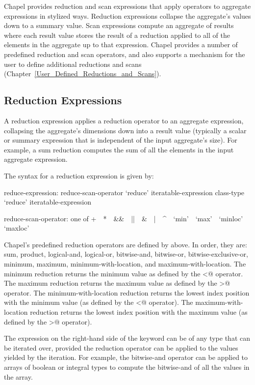 Chapel provides reduction and scan expressions that apply operators to
aggregate expressions in stylized ways.  Reduction expressions
collapse the aggregate's values down to a summary value.  Scan
expressions compute an aggregate of results where each result value
stores the result of a reduction applied to all of the elements in the
aggregate up to that expression.  Chapel provides a number of predefined
reduction and scan operators, and also supports a mechanism for the
user to define additional reductions and
scans (Chapter~\ref{User_Defined_Reductions_and_Scans}).

\subsection{Reduction Expressions}
\label{reduce}

A reduction expression applies a reduction operator to an aggregate
expression, collapsing the aggregate's dimensions down into a result
value (typically a scalar or summary expression that is independent of
the input aggregate's size).  For example, a sum reduction computes
the sum of all the elements in the input aggregate expression.

The syntax for a reduction expression is given by:
\begin{syntax}
reduce-expression:
  reduce-scan-operator `reduce' iteratable-expression
  class-type `reduce' iteratable-expression

reduce-scan-operator: one of
  + $ $ $ $ * $ $ $ $ && $ $ $ $ || $ $ $ $ & $ $ $ $ | $ $ $ $ ^ $ $ $ $ `min' $ $ $ $ `max' $ $ $ $ `minloc' $ $ $ $ `maxloc'
\end{syntax}

Chapel's predefined reduction operators are defined
by  above.  In order, they are: sum,
product, logical-and, logical-or, bitwise-and, bitwise-or,
bitwise-exclusive-or, minimum, maximum, minimum-with-location, and
maximum-with-location.  The minimum reduction returns the minimum
value as defined by the \verb@<@ operator.  The maximum reduction
returns the maximum value as defined by the \verb@>@ operator.  The
minimum-with-location reduction returns the lowest index position with
the minimum value (as defined by the \verb@<@ operator).  The
maximum-with-location reduction returns the lowest index position with
the maximum value (as defined by the \verb@>@ operator).

The expression on the right-hand side of the  keyword
can be of any type that can be iterated over, provided
the reduction operator can be applied to the values yielded
by the iteration. For example, the bitwise-and
operator can be applied to arrays of boolean or integral types to
compute the bitwise-and of all the values in the array.

